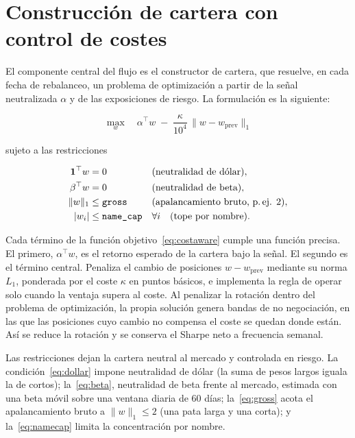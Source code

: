\section{Construcción de cartera con control de costes}\label{sec:p2-construccion}

El componente central del flujo es el constructor de cartera, que resuelve, en cada fecha
de rebalanceo, un problema de optimización a partir de la señal neutralizada $\alpha$ y de
las exposiciones de riesgo. La formulación es la siguiente:

\begin{equation}\label{eq:costaware}
  \max_{w}\quad \alpha^{\top} w
  \;-\; \frac{\kappa}{10^{4}}\,\bigl\lVert w - w_{\text{prev}}\bigr\rVert_{1}
\end{equation}

sujeto a las restricciones

\begin{align}
  \mathbf{1}^{\top} w &= 0 & &\text{(neutralidad de dólar)},\label{eq:dollar}\\
  \beta^{\top} w &= 0 & &\text{(neutralidad de beta)},\label{eq:beta}\\
  \lVert w \rVert_{1} &\le \texttt{gross} & &\text{(apalancamiento bruto, p.\,ej. } 2),\label{eq:gross}\\
  \lvert w_{i} \rvert &\le \texttt{name\_cap} & &\forall i \quad \text{(tope por nombre)}.\label{eq:namecap}
\end{align}

Cada término de la función objetivo~\eqref{eq:costaware} cumple una función precisa. El
primero, $\alpha^{\top} w$, es el retorno esperado de la cartera bajo la señal. El
segundo es el término central. Penaliza el cambio de posiciones $w - w_{\text{prev}}$
mediante su norma $L_1$, ponderada por el coste $\kappa$ en puntos básicos, e implementa la
regla de operar solo cuando la ventaja supera al coste. Al penalizar la rotación dentro del
problema de optimización, la propia solución genera bandas de no negociación, en las
que las posiciones cuyo cambio no compensa el coste se quedan donde están. Así se reduce
la rotación y se conserva el Sharpe neto a frecuencia semanal.

Las restricciones dejan la cartera neutral al mercado y controlada en riesgo.
La condición~\eqref{eq:dollar} impone neutralidad de dólar (la suma de pesos largos iguala
la de cortos); la~\eqref{eq:beta}, neutralidad de beta frente al mercado, estimada con una
beta móvil sobre una ventana diaria de 60 días; la~\eqref{eq:gross} acota el
apalancamiento bruto a $\lVert w \rVert_1 \le 2$ (una pata larga y una corta); y
la~\eqref{eq:namecap} limita la concentración por nombre. 

